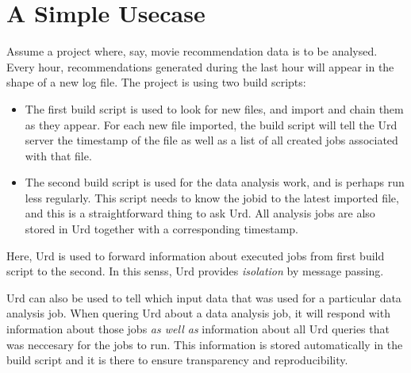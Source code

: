 \section{A Simple Usecase}

Assume a project where, say, movie recommendation data is to be
analysed.  Every hour, recommendations generated during the last hour
will appear in the shape of a new log file.  The project is using two
build scripts:
\begin{itemize}
\item[] The first build script is used to look for new files, and import and chain
  them as they appear.  For each new file imported, the build script
  will tell the Urd server the timestamp of the file as well as a list
  of all created jobs associated with that file.

\item[] The second build script is used for the data analysis work, and is perhaps run less regularly.
  This script needs to know the jobid to the latest imported file, and
  this is a straightforward thing to ask Urd.  All analysis jobs are
  also stored in Urd together with a corresponding timestamp.
\end{itemize}
Here, Urd is used to forward information about executed jobs from
first build script to the second.  In this senss, Urd
provides \textsl{isolation} by message passing.

Urd can also be used to tell which input data that was used for a
particular data analysis job.  When quering Urd about a data analysis
job, it will respond with information about those jobs \textsl{as well
as} information about all Urd queries that was neccesary for the jobs
to run.  This information is stored automatically in the build script
and it is there to ensure transparency and reproducibility.









